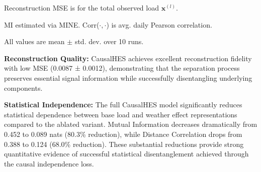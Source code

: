 \documentclass[journal]{IEEEtran}
\begin{document}
\begin{table}[t!]
\centering
\caption{Disentanglement and Separation Quality Metrics for CausalHES on the Irish CER Dataset. Dependence metrics are between $\mathbf{z}_{\text{base}}$ and $\mathbf{z}_{\text{weather}}$. Lower is better for MI and dCor; higher is better for Correlation.}
\label{tab:separation_quality_metrics}
\begin{tablenotes}
\small
\item Reconstruction MSE is for the total observed load $\mathbf{x}^{(l)}$.
\item MI estimated via MINE. Corr($\cdot,\cdot$) is avg. daily Pearson correlation.
\item All values are mean $\pm$ std. dev. over 10 runs.
\end{tablenotes}
\end{table}

\textbf{Reconstruction Quality:} CausalHES achieves excellent reconstruction fidelity with low MSE (0.0087 ± 0.0012), demonstrating that the separation process preserves essential signal information while successfully disentangling underlying components.

\textbf{Statistical Independence:} The full CausalHES model significantly reduces statistical dependence between base load and weather effect representations compared to the ablated variant. Mutual Information decreases dramatically from 0.452 to 0.089 nats (80.3\% reduction), while Distance Correlation drops from 0.388 to 0.124 (68.0\% reduction). These substantial reductions provide strong quantitative evidence of successful statistical disentanglement achieved through the causal independence loss.
\end{document}
